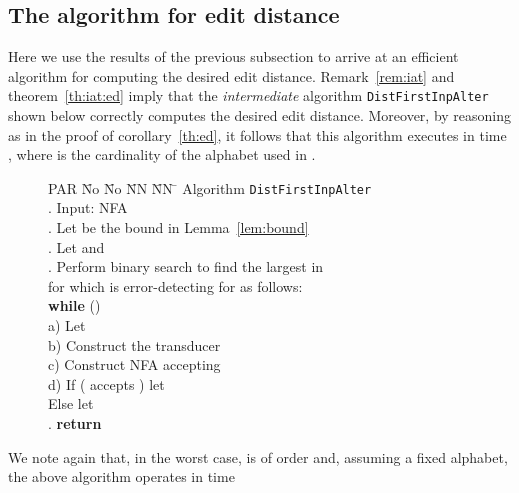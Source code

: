 \documentclass{article}
\theoremstyle{plain}
\theoremstyle{definition}
\theoremstyle{remark}
\begin{document}
\subsection{The  algorithm for edit distance}
Here we use the results of the previous subsection to arrive at an efficient algorithm for computing the desired
edit distance.
Remark~\ref{rem:iat}  and theorem~\ref{th:iat:ed}  imply that the \emph{intermediate} algorithm
\texttt{DistFirstInpAlter}
shown below correctly computes the desired edit distance. Moreover, by reasoning as in the proof of corollary~\ref{th:ed}, it follows that this algorithm executes in time , where  is the cardinality of the alphabet used in .


\begin{figure}[ht]
\begin{tabbing}
PAR \= No \= No \= NN \= NN \=\kill
\> Algorithm \texttt{DistFirstInpAlter} \\
.\> Input: NFA  \hspace{4mm} \\
.\> Let  be the bound in Lemma~\ref{lem:bound}\\
.\> Let  and  \\
.\> Perform binary search to find  the largest  in
       \\
\>  \> for which  is error-detecting for  as follows: \\
\>  \>  \textbf{while} ()\\
\>  \>  a)\> Let \\
\>   \> b)\> Construct the transducer  \\
\>   \> c)\> Construct NFA   accepting \\
\>   \> d)\> If ( accepts )  let \\
\>   \> \>  Else  let \\
. \> \textbf{return} 
\end{tabbing}
\end{figure}


We note again that, in the worst case,  is
of order  and, assuming a fixed alphabet, the above algorithm operates in time
\end{document}
